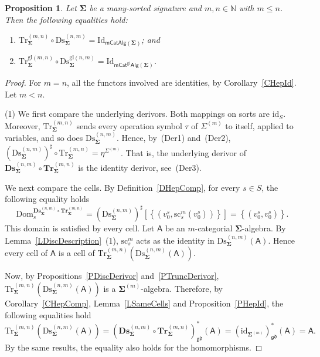 \documentclass[a4paper, reqno
]{amsart}
\newcommand{\sig}[1]{\mathbf{#1}}             %
\newcommand{\calg}[1]{\boldsymbol{\mathsf{#1}}} %
\newcommand{\Dom}{\mathrm{Dom}}
\newcommand{\id}{\mathrm{id}}
\newcommand{\Id}{\mathrm{Id}}
\newcommand{\gd}{\mathfrak{gd}}              %
\newcommand{\gl}{\mathrm{gl}}                %
\newcommand{\src}{\mathrm{sc}}
\newcommand{\Ds}{\mathrm{Ds}}
\newcommand{\Tr}{\mathrm{Tr}}
\newcommand{\bDs}{\mathbf{Ds}}
\newcommand{\bTr}{\mathbf{Tr}}
\theoremstyle{plain}
\newtheorem{proposition}[theorem]{Proposition}
\theoremstyle{definition}
\begin{document}
\begin{proposition}\label{PTruncDisc}
Let $\sig{\Sigma}$ be a many-sorted signature and $m,n\in\mathbb{N}$ with $m\leq n$.
Then the following equalities hold:
\begin{enumerate}
	\item
	$\Tr^{(m,n)}_{\sig{\Sigma}}\circ\Ds^{(n,m)}_{\sig{\Sigma}}=\Id_{\mathsf{mCatAlg}(\sig{\Sigma})}$; and

	\item
	$\Tr^{\gl(m,n)}_{\sig{\Sigma}}\circ\Ds^{\gl(n,m)}_{\sig{\Sigma}}=\Id_{\mathsf{mCat}^{\gl}\mathsf{Alg}(\sig{\Sigma})}$.
\end{enumerate}
\end{proposition}
\begin{proof}
For $m=n$, all the functors involved are identities, by Corollary~\ref{CHepId}.
Let $m<n$.

(1) We first compare the underlying derivors.
Both mappings on sorts are $\id_{S}$.
Moreover, $\Tr^{(m,n)}_{\sig{\Sigma}}$ sends every operation symbol $\tau$ of $\Sigma^{(m)}$ to itself, applied to variables, and so does $\Ds^{(n,m)}_{\sig{\Sigma}}$.
Hence, by~(Der1) and~(Der2), $(\Ds^{(n,m)}_{\sig{\Sigma}})^{\sharp}\circ\Tr^{(m,n)}_{\sig{\Sigma}}=\eta^{\Sigma^{(m)}}$.
That is, the underlying derivor of $\bDs^{(n,m)}_{\sig{\Sigma}}\circ\bTr^{(m,n)}_{\sig{\Sigma}}$ is the identity derivor, see~(Der3).

We next compare the cells.
By Definition~\ref{DHepComp}, for every $s\in S$, the following equality holds
$$
\Dom^{\bDs^{(n,m)}_{\sig{\Sigma}}\circ\bTr^{(m,n)}_{\sig{\Sigma}}}_{s}=\left(\Ds^{(n,m)}_{\sig{\Sigma}}\right)^{\sharp}\left[\left\lbrace\left(v^{s}_{0},\src^{m}_{s}(v^{s}_{0})\right)\right\rbrace\right]=\left\lbrace\left(v^{s}_{0},v^{s}_{0}\right)\right\rbrace.
$$
This domain is satisfied by every cell.
Let $\calg{A}$ be an $m$-categorial $\sig{\Sigma}$-algebra.
By Lemma~\ref{LDiscDescription}~(1), $\src^{m}_{s}$ acts as the identity in $\Ds^{(n,m)}_{\sig{\Sigma}}(\calg{A})$.
Hence every cell of $\calg{A}$ is a cell of $\Tr^{(m,n)}_{\sig{\Sigma}}(\Ds^{(n,m)}_{\sig{\Sigma}}(\calg{A}))$.

Now, by Propositions~\ref{PDiscDerivor} and~\ref{PTruncDerivor}, $\Tr^{(m,n)}_{\sig{\Sigma}}(\Ds^{(n,m)}_{\sig{\Sigma}}(\calg{A}))$ is a $\sig{\Sigma}^{(m)}$-algebra.
Therefore, by Corollary~\ref{CHepComp}, Lemma~\ref{LSameCells} and Proposition~\ref{PHepId}, the following equalities hold
$$
\Tr^{(m,n)}_{\sig{\Sigma}}\left(\Ds^{(n,m)}_{\sig{\Sigma}}(\calg{A})\right)
=
\left(\bDs^{(n,m)}_{\sig{\Sigma}}\circ\bTr^{(m,n)}_{\sig{\Sigma}}\right)^{\ast}_{\gd}(\calg{A})
=
\left(\id_{\sig{\Sigma}^{(m)}}\right)^{\ast}_{\gd}(\calg{A})
=
\calg{A}.
$$
By the same results, the equality also holds for the homomorphisms.


\end{proof}
\end{document}
